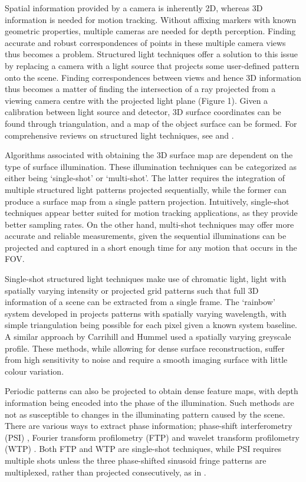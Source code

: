 \documentclass[class=article, crop=false]{standalone}
\begin{document}
Spatial information provided by a camera is inherently 2D, whereas 3D information is needed for motion tracking. Without affixing markers with known geometric properties, multiple cameras are needed for depth perception. Finding accurate and robust correspondences of points in these multiple camera views thus becomes a problem. Structured light techniques offer a solution to this issue by replacing a camera with a light source that projects some user-defined pattern onto the scene. Finding correspondences between views and hence 3D information thus becomes a matter of finding the intersection of a ray projected from a viewing camera centre with the projected light plane (Figure 1). Given a calibration between light source and detector, 3D surface coordinates can be found through triangulation, and a map of the object surface can be formed. For comprehensive reviews on structured light techniques, see \cite{Geng2011} and \cite{Salvi2010}.
\par
Algorithms associated with obtaining the 3D surface map are dependent on the type of surface illumination. These illumination techniques can be categorized as either being ‘single-shot’ or ‘multi-shot’. The latter requires the integration of multiple structured light patterns projected sequentially, while the former can produce a surface map from a single pattern projection. Intuitively, single-shot techniques appear better suited for motion tracking applications, as they provide better sampling rates. On the other hand, multi-shot techniques may offer more accurate and reliable measurements, given the sequential illuminations can be projected and captured in a short enough time for any motion that occurs in the FOV. 
\par
Single-shot structured light techniques make use of chromatic light, light with spatially varying intensity or projected grid patterns such that full 3D information of a scene can be extracted from a single frame. The `rainbow' system developed in \parencite{JasonGeng1996} projects patterns with spatially varying wavelength, with simple triangulation being possible for each pixel given a known system baseline. A similar approach by Carrihill and Hummel \parencite*{Carrihill1985} used a spatially varying greyscale profile. These methods, while allowing for dense surface reconstruction, suffer from high sensitivity to noise and require a smooth imaging surface with little colour variation.
\par
Periodic patterns can also be projected to obtain dense feature maps, with depth information being encoded into the phase of the illumination. Such methods are not as susceptible to changes in the illuminating pattern caused by the scene. There are various ways to extract phase information; phase-shift interferometry (PSI) \parencite{ISI:A1974U657500060,Huang1999}, Fourier transform profilometry (FTP) \parencite{Takeda:83,Yue20071170} and wavelet transform profilometry (WTP) \parencite{Gdeisat2006482,Fernandez2010}. Both FTP and WTP are single-shot techniques, while PSI requires multiple shots unless the three phase-shifted sinusoid fringe patterns are multiplexed, rather than projected consecutively, as in \cite{Huang1999}.
\end{document}
